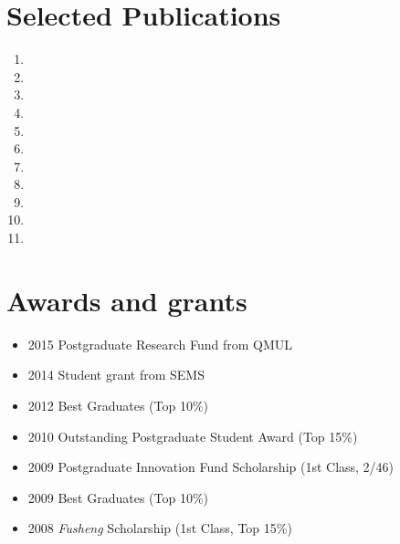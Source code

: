 \documentclass[letterpaper]{article}
\begin{document}
\vspace{-12pt}
\section*{Selected Publications}
\vspace{-10pt}




\begin{enumerate}
\item {}
\item {}
\item {}
\item {}
\item {}
\item {}
\item {}
\item {}
\item {}
\item {}
\item {}

\end{enumerate}


\vspace{-12pt}
\section*{Awards and grants}
\vspace{-10pt}
\begin{itemize}
\item 2015 Postgraduate Research Fund from QMUL
\item 2014 Student grant from SEMS
\item 2012 Best Graduates (Top 10\%)
\item 2010 Outstanding Postgraduate Student Award (Top 15\%)
\item 2009 Postgraduate Innovation Fund Scholarship (1st Class, 2/46)
\item 2009 Best Graduates (Top 10\%)
\item 2008 \textit{Fusheng} Scholarship (1st Class, Top 15\%)
\end{itemize}
\end{document}
